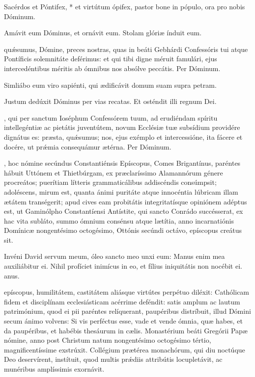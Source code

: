 \documentclass[fontsize=9pt,paper=A6,twoside,BCOR=1mm,DIV=22,headinclude]{scrarticle}
\renewcommand\A{\Ant}
\begin{document}
\begin{multicols}{2}

\M Sacérdos et Póntifex, * et virtútum ópifex, pastor bone in pópulo, ora pro nobis Dóminum.

\V Amávit eum Dóminus, et ornávit eum.
\R Stolam glóriæ índuit eum.

 qu\'æsumus, Dómine, preces nostras, quas in beáti Gebhárdi Confessóris tui atque Pontíficis solemnitáte deférimus: et qui tibi digne méruit famulári, ejus intercedéntibus méritis ab ómnibus nos absólve peccátis. Per Dóminum.


\A Simliábo eum viro sapiénti, qui ædificávit domum suam supra petram.

\V Justum dedúxit Dóminus per vias recatas.
\R Et osténdit illi regnum Dei.

, qui per sanctum Ioséphum Confessórem tuum, ad erudiéndam spíritu intellegéntiæ ac pietátis juventútem, novum Ecclésiæ tuæ subsídium providére dignátus es: præsta, quǽsumus; nos, ejus exémplo et intercessióne, ita fácere et docére, ut prǽmia consequámur ætérna. Per Dóminum.

, hoc nómine secúndus Constantiénsis Epíscopus, Comes Brigantínus, paréntes hábuit Uttónem et Thietbúrgam, ex præclaríssimo Alamannórum génere procreátos; puerítiam lítteris grammaticálibus addiscéndis consúmpsit; adoléscens, mirum est, quanta ánimi puritáte atque innocéntia lúbricam illam ætátem transégerit; apud cives eam probitátis integritatísque opiniónem adéptus est, ut Gaminólpho Constantíensi Antístite, qui sancto Conrádo succésserat, ex hac vita subláto, summo ómnium consénsu atque lætítia, anno incarnatiónis Domínicæ nongentésimo octogésimo, Ottónis secúndi octávo, epíscopus creátus sit.

\R Invéni David servum meum, óleo sancto meo unxi eum: \red{*} Manus enim mea auxiliábitur ei.
\V Nihil profíciet inimícus in eo, et fílius iniquitátis non nocébit ei. anus.

 epíscopus, humilitátem, castitátem aliásque virtútes perpétuo diléxit: Cathólicam fidem et disciplínam ecclesiásticam acérrime deféndit: satis amplum ac lautum patrimónium, quod ei pii paréntes relíquerant, paupéribus distríbuit, illud Dómini secum ánimo volvens: Si vis perféctus esse, vade et vende ómnia, quæ habes, et da paupéribus, et habébis thesáurum in cælis. Monastérium beáti Gregórii Papæ nómine, anno post Christum natum nongentésimo octogésimo tértio, magnificentíssime exstrúxit. Collégium prætérea monachórum, qui diu noctúque Deo deservírent, instítuit, quod multis pr\'ædiis attribútis locupletávit, ac munéribus amplíssimis exornávit.


\end{multicols}
\end{document}
